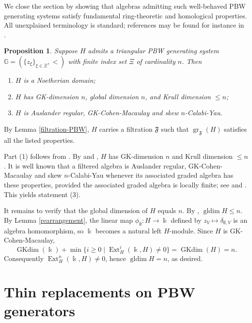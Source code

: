 \documentclass{article}
\makeatletter
\renewenvironment{proof}[1][\proofname]{\par
	\pushQED{\qed}%
	\normalfont \topsep6\p@\@plus6\p@\relax
	\trivlist
	\item[\hskip\labelsep
	\bfseries
	#1\@addpunct{.}]\ignorespaces
}{%
	\popQED\endtrivlist\@endpefalse
}
\theoremstyle{plain}
\newtheorem{prop}[thm]{Proposition}
\theoremstyle{definition}
\numberwithin{equation}{section}
\DeclareMathOperator{\gr}{gr}
\DeclareMathOperator{\GKdim}{GKdim}
\newcommand{\GG}{\mathbb{G}}
\makeatother
\begin{document}
	We close the section by showing that algebras admitting such well-behaved PBW generating systems satisfy fundamental ring-theoretic and homological properties. All unexplained terminology is standard; references may be found for instance in \cite{Le92, RRZ14}.
	
	\begin{prop}\label{ring-homo-properties}
		Suppose $H$ admits a triangular PBW generating system $\GG=(\{z_{\xi}\}_{\xi\in \Xi}, <)$ with finite index set $\Xi$ of cardinality $n$. Then
		\begin{enumerate}
			\item $H$ is a Noetherian domain;
			\item $H$ has GK-dimension $n$, global dimension $n$, and Krull dimension $\leq n$;
			\item $H$ is Auslander regular, GK-Cohen-Macaulay and skew $n$-Calabi-Yau.
		\end{enumerate}
	\end{prop}
	
	\begin{proof}
		By Lemma \ref{filtration-PBW}, $H$ carries a filtration $\mathfrak{F}$ such that $\gr_{\mathfrak{F}}(H)$ satisfies all the listed properties.
		
		Part (1) follows from \cite[Theorem 1.6.6, Theorem 1.6.9]{MR01}. By \cite[Proposition 6.6]{KL00} and \cite[Lemma 6.5.6]{MR01}, $H$ has GK-dimension $n$ and Krull dimension $\leq n$. It is well known that a filtered algebra is Auslander regular, GK-Cohen-Macaulay and skew $n$-Calabi-Yau whenever its associated graded algebra has these properties, provided the associated graded algebra is locally finite; see \cite[Proposition 7.6]{ZSL19} and \cite[Theorem 4.4]{ZSL20-1}. This yields statement (3).
		
		It remains to verify that the global dimension of $H$ equals $n$. By \cite[Corollary 6.18]{MR01}, $\operatorname{gldim} H \leq n$. By Lemma \ref{rearrangement}, the linear map $\phi_{\emptyset}\colon H\to \Bbbk$ defined by $z_{V}\mapsto \delta_{\emptyset, V}$ is an algebra homomorphism, so $\Bbbk$ becomes a natural left $H$-module. Since $H$ is GK-Cohen-Macaulay,
		\[
		\GKdim(\Bbbk) + \min\{i\geq 0 \mid \operatorname{Ext}_{H}^{i} (\Bbbk, H) \neq 0\} = \GKdim (H) =n.
		\]
		Consequently $\operatorname{Ext}_{H}^{n} (\Bbbk, H) \neq  0$, hence $\operatorname{gldim} H = n$, as desired.
	\end{proof}
	
	
	
	\section{Thin replacements on  PBW generators}
	\label{sec:thin-replacement}
	
\end{document}
